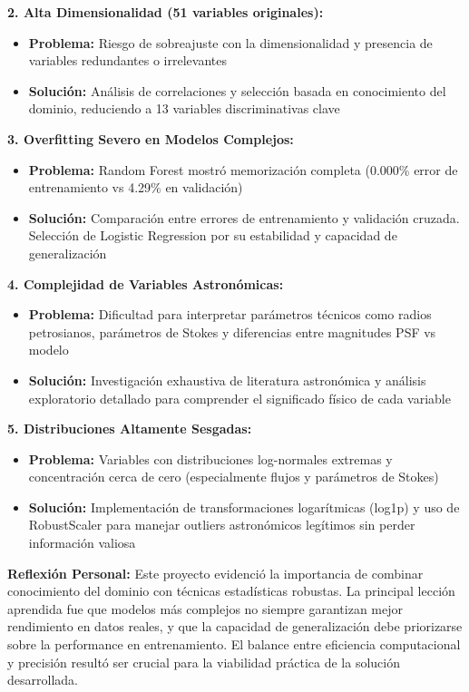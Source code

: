 \documentclass{article}
\begin{document}
\textbf{2. Alta Dimensionalidad (51 variables originales):}
\begin{itemize}
    \item \textbf{Problema:} Riesgo de sobreajuste con la dimensionalidad y presencia de variables redundantes o irrelevantes
    \item \textbf{Solución:} Análisis de correlaciones y selección basada en conocimiento del dominio, reduciendo a 13 variables discriminativas clave
\end{itemize}

\textbf{3. Overfitting Severo en Modelos Complejos:}
\begin{itemize}
    \item \textbf{Problema:} Random Forest mostró memorización completa (0.000\% error de entrenamiento vs 4.29\% en validación)
    \item \textbf{Solución:} Comparación entre errores de entrenamiento y validación cruzada. Selección de Logistic Regression por su estabilidad y capacidad de generalización
\end{itemize}

\textbf{4. Complejidad de Variables Astronómicas:}
\begin{itemize}
    \item \textbf{Problema:} Dificultad para interpretar parámetros técnicos como radios petrosianos, parámetros de Stokes y diferencias entre magnitudes PSF vs modelo
    \item \textbf{Solución:} Investigación exhaustiva de literatura astronómica y análisis exploratorio detallado para comprender el significado físico de cada variable
\end{itemize}

\textbf{5. Distribuciones Altamente Sesgadas:}
\begin{itemize}
    \item \textbf{Problema:} Variables con distribuciones log-normales extremas y concentración cerca de cero (especialmente flujos y parámetros de Stokes)
    \item \textbf{Solución:} Implementación de transformaciones logarítmicas (log1p) y uso de RobustScaler para manejar outliers astronómicos legítimos sin perder información valiosa
\end{itemize}

\textbf{Reflexión Personal:}
Este proyecto evidenció la importancia de combinar conocimiento del dominio con técnicas estadísticas robustas. La principal lección aprendida fue que modelos más complejos no siempre garantizan mejor rendimiento en datos reales, y que la capacidad de generalización debe priorizarse sobre la performance en entrenamiento. El balance entre eficiencia computacional y precisión resultó ser crucial para la viabilidad práctica de la solución desarrollada.
\end{document}

